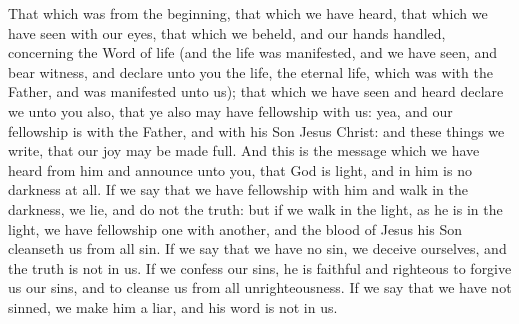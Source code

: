 


That which was from the beginning, that which we have heard, that which we have seen with our eyes, that which we beheld, and our hands handled, concerning the Word of life (and the life was manifested, and we have seen, and bear witness, and declare unto you the life, the eternal life, which was with the Father, and was manifested unto us); that which we have seen and heard declare we unto you also, that ye also may have fellowship with us: yea, and our fellowship is with the Father, and with his Son Jesus Christ: and these things we write, that our joy may be made full.  And this is the message which we have heard from him and announce unto you, that God is light, and in him is no darkness at all. If we say that we have fellowship with him and walk in the darkness, we lie, and do not the truth: but if we walk in the light, as he is in the light, we have fellowship one with another, and the blood of Jesus his Son cleanseth us from all sin. If we say that we have no sin, we deceive ourselves, and the truth is not in us. If we confess our sins, he is faithful and righteous to forgive us our sins, and to cleanse us from all unrighteousness. If we say that we have not sinned, we make him a liar, and his word is not in us. 

